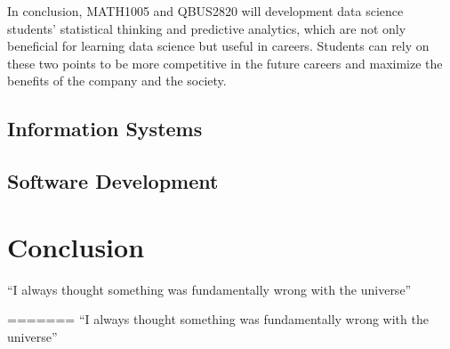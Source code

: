\documentclass[12pt]{article}
\begin{document}
In conclusion, MATH1005 and QBUS2820 will development data science students' statistical thinking and predictive analytics, which are not only beneficial for learning data science but useful in careers. Students can rely on these two points to be more competitive in the future careers and maximize the benefits of the company and the society.

\subsection{Information Systems}


\subsection{Software Development}

\section{Conclusion}
``I always thought something was fundamentally wrong with the universe'' \citep{adams1995hitchhiker}



=======
``I always thought something was fundamentally wrong with the universe\cite{Burridge_2018a}''
{}

% 








\end{document}

